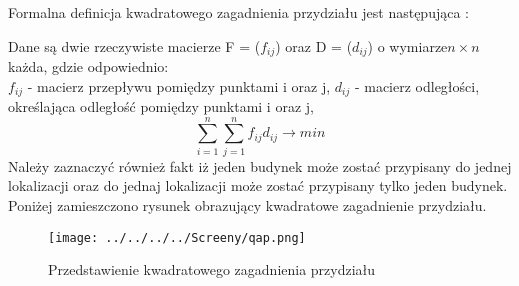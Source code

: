 Formalna definicja kwadratowego zagadnienia przydziału jest następująca \cite{chmiel} :

Dane są dwie rzeczywiste macierze F = ($f_{ij}$) oraz D = ($d_{ij}$) o wymiarze$ n \times n $każda, gdzie odpowiednio:\\
$f_{ij}$ - macierz przepływu pomiędzy punktami i oraz j,
$d_{ij}$ - macierz odległości, określająca odległość pomiędzy punktami i oraz j,
$$
\sum_{i=1}^{n}\sum_{j=1}^{n}f_{ij}d_{ij} \longrightarrow min
$$
Należy zaznaczyć również fakt iż jeden budynek może zostać przypisany do jednej lokalizacji oraz do jednaj lokalizacji może zostać  przypisany tylko jeden budynek. Poniżej zamieszczono rysunek obrazujący kwadratowe zagadnienie przydziału.

\begin{figure}[h!]
\begin{center}
		\texttt{[image: ../../../../Screeny/qap.png]}
		\caption{Przedstawienie kwadratowego zagadnienia przydziału \cite{qap_rys}}
		\label{qap}		
\end{center}	
\end{figure}

